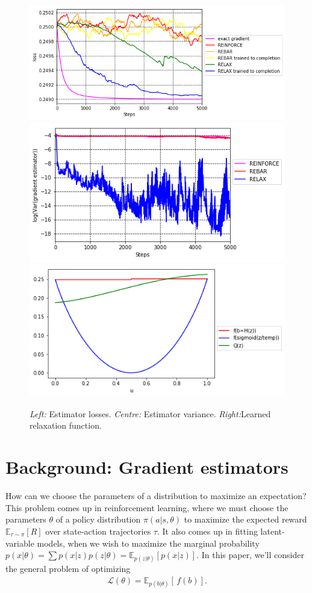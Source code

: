 \documentclass{article}
\newcommand{\discreteDist}{p(b|\theta)}
\newcommand{\loss}{f(b)}
\newcommand{\expectedLoss}{\mathbb{E}_{\discreteDist{}} \! \left[ \, \loss{} \right]}
\begin{document}
\begin{figure}[h]
\begin{center}
\includegraphics[width=.3\textwidth]{figures/losses}
\includegraphics[width=.3\textwidth]{figures/variance_no_opt}
\includegraphics[width=.3\textwidth]{figures/learned_r}
\label{first figure}
\end{center}
\caption{
\emph{Left:} Estimator losses.
\emph{Centre:} Estimator variance.
\emph{Right:}Learned relaxation function.
}
\end{figure}





\section{Background: Gradient estimators}


How can we choose the parameters of a distribution to maximize an expectation?
This problem comes up in reinforcement learning, where we must choose the parameters $\theta$ of a policy distribution $\pi(a|s, \theta)$ to maximize the expected reward $\mathbb{E}_{\tau \sim \pi} \left[ R \right]$ over state-action trajectories $\tau$.
It also comes up in fitting latent-variable models, when we wish to maximize the marginal probability ${p(x|\theta) = \sum p(x|z) p(z|\theta) = \mathbb{E}_{p(z|\theta)} \left[ p(x|z) \right]}$.
In this paper, we'll consider the general problem of optimizing
%
\begin{align}
\mathcal{L}(\theta)=\expectedLoss{}.
\end{align}
%
\end{document}
